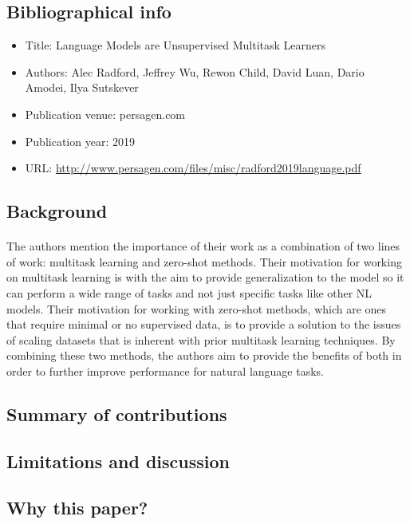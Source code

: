 \documentclass[11pt,a4paper]{article}
\begin{document}
\subsection{Bibliographical info}

\begin{itemize}
  \item Title: Language Models are Unsupervised Multitask Learners
  \item Authors: Alec Radford, Jeffrey Wu, Rewon Child, David Luan, Dario Amodei, Ilya Sutskever
  \item Publication venue: persagen.com
  \item Publication year: 2019
  \item URL: \url{http://www.persagen.com/files/misc/radford2019language.pdf}
\end{itemize}

\subsection{Background}

\paragraph{}
The authors mention the importance of their work as a combination of two lines of work: multitask 
learning and zero-shot methods. Their motivation for working on multitask learning is with the aim 
to provide generalization to the model so it can perform a wide range of tasks and not just specific 
tasks like other NL models. Their motivation for working with zero-shot methods, which are ones that 
require minimal or no supervised data, is to provide a solution to the issues of scaling datasets that 
is inherent with prior multitask learning techniques. By combining these two methods, the authors aim 
to provide the benefits of both in order to further improve performance for natural language tasks. 

\subsection{Summary of contributions}

\subsection{Limitations and discussion}

\subsection{Why this paper?}
\end{document}
